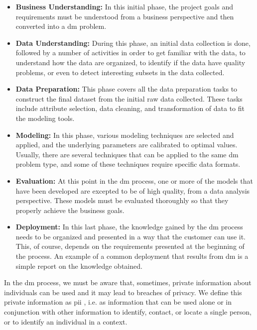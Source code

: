 \begin{itemize}

    \item\textbf{Business Understanding:} In this initial phase, the project goals and requirements must be understood from a business perspective and then converted into a \ac{dm} problem.

    \item\textbf{Data Understanding:} During this phase, an initial data collection is done, followed by a number of activities in order to get familiar with the data, to understand how the data are organized, to identify if the data have quality problems, or even to detect interesting subsets in the data collected.

    \item\textbf{Data Preparation:} This phase covers all the data preparation tasks to construct the final dataset from the initial raw data collected. These tasks include attribute selection, data cleaning, and transformation of data to fit the modeling tools.

    \item\textbf{Modeling:} In this phase, various modeling techniques are selected and applied, and the underlying parameters are calibrated to optimal values. Usually, there are several techniques that can be applied to the same \ac{dm} problem type, and some of these techniques require specific data formats.

    \item\textbf{Evaluation:} At this point in the \ac{dm} process, one or more of the models that have been developed are excepted to be of high quality, from a data analysis perspective. These models must be evaluated thoroughly so that they properly achieve the business goals.

    \item\textbf{Deployment:} In this last phase, the knowledge gained by the \ac{dm} process needs to be organized and presented in a way that the customer can use it. This, of course, depends on the requirements presented at the beginning of the process. An example of a common deployment that results from \ac{dm} is a simple report on the knowledge obtained. 

\end{itemize}


In the \ac{dm} process, we must be aware that, sometimes, private information about individuals can be used and it may lead to breaches of privacy. We define this private information as \ac{pii} \cite{schwartz2011pii}, i.e. as information that can be used alone or in conjunction with other information to identify, contact, or locate a single person, or to identify an individual in a context.



